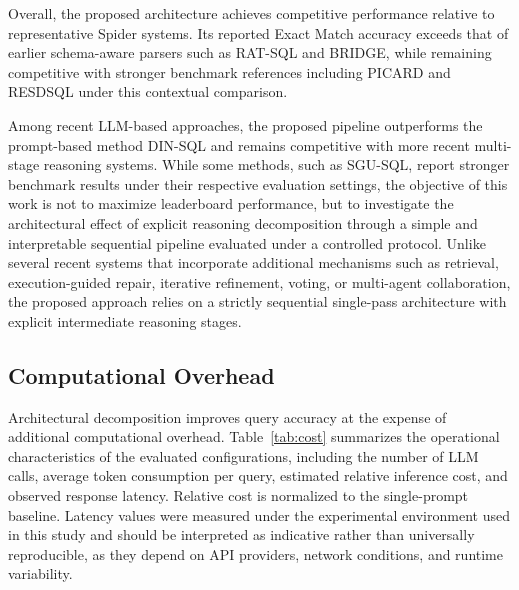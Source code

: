 \documentclass{svproc}
\begin{document}
Overall, the proposed architecture achieves competitive performance relative to representative Spider systems. Its reported Exact Match accuracy exceeds that of earlier schema-aware parsers such as RAT-SQL and BRIDGE, while remaining competitive with stronger benchmark references including PICARD and RESDSQL under this contextual comparison.

Among recent LLM-based approaches, the proposed pipeline outperforms the prompt-based method DIN-SQL and remains competitive with more recent multi-stage reasoning systems. While some methods, such as SGU-SQL, report stronger benchmark results under their respective evaluation settings, the objective of this work is not to maximize leaderboard performance, but to investigate the architectural effect of explicit reasoning decomposition through a simple and interpretable sequential pipeline evaluated under a controlled protocol. Unlike several recent systems that incorporate additional mechanisms such as retrieval, execution-guided repair, iterative refinement, voting, or multi-agent collaboration, the proposed approach relies on a strictly sequential single-pass architecture with explicit intermediate reasoning stages.


\subsection{Computational Overhead}
\label{subsec:cost}

Architectural decomposition improves query accuracy at the expense of additional computational overhead. Table~\ref{tab:cost} summarizes the operational characteristics of the evaluated configurations, including the number of LLM calls, average token consumption per query, estimated relative inference cost, and observed response latency. Relative cost is normalized to the single-prompt baseline. Latency values were measured under the experimental environment used in this study and should be interpreted as indicative rather than universally reproducible, as they depend on API providers, network conditions, and runtime variability.
\end{document}
